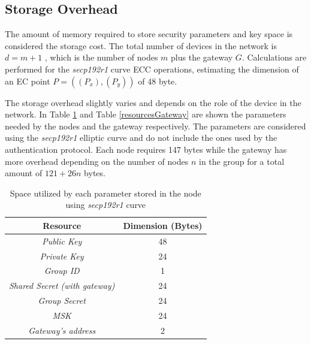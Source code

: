 \subsection{Storage Overhead}
The amount of memory required to store security parameters and key space is considered the storage cost. The total number of devices in the network is $d = m + 1$ , which is the number of nodes $m$ plus the gateway $G$. 
Calculations are performed for the \textit{secp192r1} curve ECC operations, estimating the dimension of an EC point $P = ((P_x),(P_y))$ of 48 byte.

The storage overhead slightly varies and depends on the role of the device in the network. 
In Table \ref{resourceNode} and Table \ref{resourcesGateway} are shown the parameters needed by the nodes and the gateway respectively. 
The parameters are considered using the \textit{secp192r1} elliptic curve and do not include the ones used by the authentication protocol.
Each node requires 147 bytes while the gateway has more overhead depending on the number of nodes  $n$ in the group for a total amount of $121 + 26 n$ bytes.

\begin{table}[H]
\caption{Space utilized by each parameter stored in the node using \textit{secp192r1} curve }
\label{resourceNode}
\begin{center}
\begin{tabular}{|c||c|}
\hline
 \textbf{Resource} & \textbf{Dimension (Bytes)}\\
\hline
\textit{Public Key} & 48\\
\hline
\textit{Private Key} & 24\\
\hline
\textit{Group ID} & 1\\
\hline
\textit{Shared Secret (with gateway)} & 24\\
\hline
\textit{Group Secret} & 24\\
\hline
\textit{MSK} & 24\\
\hline
\textit{Gateway's address}  & 2\\
\hline
\end{tabular}
\end{center}
\end{table}

